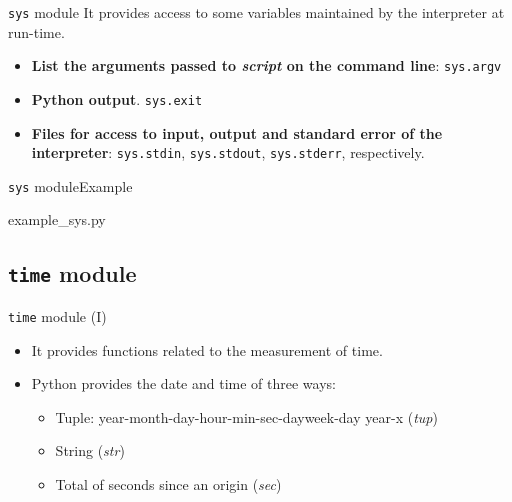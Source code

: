 \documentclass[10pt,compress]{beamer} %
\begin{document}
\begin{frame}{\texttt{sys} module}
\vspace{-0.2cm}
It provides access to some variables maintained by the interpreter at run-time.\\
\begin{block}{}
\footnotesize{
\begin{itemize}			
\item \textbf{List the arguments passed to \textit{script} on the command line}: \texttt{sys.argv}
\item \textbf{Python output}. \texttt{sys.exit}
\item \textbf{Files for access to input, output and standard error of the interpreter}: \texttt{sys.stdin}, \texttt{sys.stdout}, \texttt{sys.stderr}, respectively. 

\end{itemize}
}
\end{block}	
\end{frame}

\begin{frame}{\texttt{sys} module}{Example}

\vspace{-0.2cm}
	\begin{block}{example\_sys.py}

	

	\end{block}
\end{frame}

\subsection{\texttt{time} module}

\begin{frame}{\texttt{time} module (I)}

\begin{itemize}
\item It provides functions related to the measurement of time.
\item Python provides the date and time of three ways:\\
\begin{itemize}
\item Tuple: year-month-day-hour-min-sec-dayweek-day year-x (\textit{tup})
\item String (\textit{str})
\item Total of seconds since an origin (\textit{sec})
\end{itemize}
\end{itemize}

\end{frame}
\end{document}
